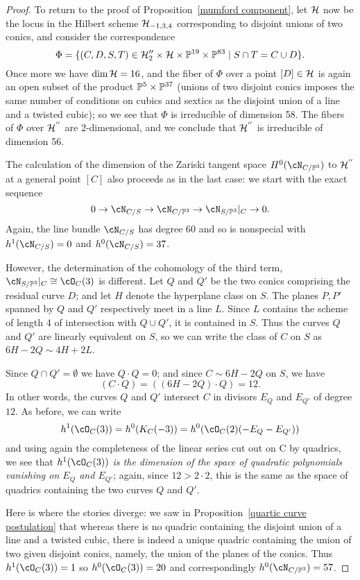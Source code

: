 \begin{proof}
To return to the proof of Proposition~\ref{mumford component}, let $\cH$ now be the locus in the Hilbert scheme $\cH_{-1,3,4}$ corresponding to disjoint unions of two conics, and consider the correspondence
$$
\Phi = \{(C,D,S,T) \in \cH_{2}'' \times \cH \times \PP^{19} \times \PP^{83} \mid S \cap T = C \cup D \}.
$$
Once more we have $\dim \cH = 16$, and the fiber of $\Phi$ over a point $[D] \in \cH$ is again an open subset of the product $\PP^5 \times \PP^{37}$ (unions of two disjoint conics imposes the same number of conditions on cubics and sextics as the disjoint union of a line and a twisted cubic); so we see that $\Phi$ is irreducible of dimension 58. The fibers of $\Phi$ over $ \cH^{''}$ are 2-dimensional, and we conclude that $ \cH^{''}$ is irreducible of dimension 56.

The calculation of the dimension of the Zariski tangent space $H^0(\cN_{C/\PP^3})$ to $ \cH^{''}$ at a general point $[C]$ also proceeds as in the last case: we start with the exact sequence
$$
0 \to \cN_{C/S} \to \cN_{C/\PP^3} \to \cN_{S/\PP^3}|_C \to 0.
$$ 
Again, the line bundle $\cN_{C/S}$ has degree 60 and so is nonspecial with $h^1(\cN_{C/S}) = 0$ and $h^0(\cN_{C/S}) = 37$.

However, the determination of the cohomology of the third term, $\cN_{S/\PP^3}|_C \cong \cO_C(3)$ is different. Let $Q$ and $Q'$ be the  two conics comprising the residual curve $D$; and let $H$ denote the hyperplane class on $S$. The planes $P,P'$ spanned by $Q$ and $Q'$ respectively meet in a line $L$. Since $L$ contains the scheme of length 4 of intersection with $Q\cup Q'$, it is contained in $S$. Thus the curves $Q$ and $Q'$ are linearly equivalent on $S$, so we can write the class of $C$ on $S$ as $6H-2Q \sim 4H+2L$.

Since $Q\cap Q' = \emptyset$ we have  $Q \cdot Q = 0$; and since $C \sim 6H - 2Q$ on $S$, we have
$$
(C\cdot Q) = ((6H - 2Q) \cdot Q) = 12.
$$
In other words, the curves $Q$ and $Q'$ intersect $C$ in divisors $E_Q$ and $E_{Q'}$ of degree $12$. As before, we can write
$$
h^1(\cO_C(3)) = h^0(K_C(-3)) = h^0(\cO_C(2)(-E_Q-E_{Q'}))
$$
and using again the completeness of the linear series cut out on C by quadrics, we see that \emph{$h^1(\cO_C(3))$ is the dimension of the space of quadratic polynomials vanishing on $E_Q$ and $E_{Q'}$}; again, since $12 > 2\cdot 2$, this is the same as the space of quadrics containing the two curves $Q$ and $Q'$. 

Here is where the stories diverge: we saw in Proposition~\ref{quartic curve postulation} that whereas there is no quadric containing the disjoint union of a line and a twisted cubic, there is indeed a unique quadric containing the union of two given disjoint conics, namely, the union of the planes of the conics.  
Thus $h^1(\cO_C(3))=1$ so  $h^0(\cO_C(3)) = 20$ and correspondingly $h^0(\cN_{C/\PP^3}) = 57$.
\end{proof}

